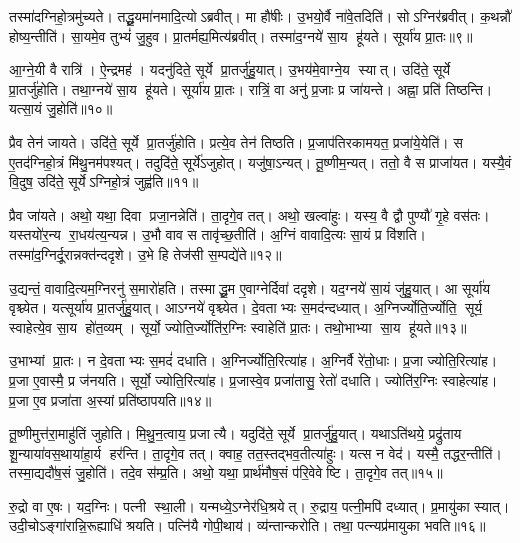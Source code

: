 तस्मा॑दग्निहो॒त्रमु॑च्यते।
तद्धू॒यमा॑नमादि॒त्योऽब्रवीत्।
मा हौ॑षीः।
उ॒भयो॒र्वै ना॑वे॒तदिति॑।
सोऽग्निर॑ब्रवीत्।
क॒थन्नौ॑ होष्य॒न्तीति॑।
सा॒यमे॒व तुभ्यं॑ जु॒हुव\sn{}।
प्रा॒तर्मह्य॒मित्य॑ब्रवीत्।
तस्मा॑द॒ग्नये॑ सा॒य हू॑यते।
सूर्या॑य प्रा॒तः॥९॥

आ॒ग्ने॒यी वै रात्रि॑।
ऐ॒न्द्रमह॑।
यदनु॑दिते॒ सूर्ये प्रा॒तर्जु॑हु॒यात्।
उ॒भय॑मे॒वाग्ने॒य स्यात्।
उदि॑ते॒ सूर्ये प्रा॒तर्जु॑होति।
तथा॒ग्नये॑ सा॒य हू॑यते।
सूर्या॑य प्रा॒तः।
रात्रिं॒ वा अनु॑ प्र॒जाः प्र जा॑यन्ते।
अह्ना॒ प्रति॑ तिष्ठन्ति।
यत्सा॒यं जु॒होति॑॥१०॥

प्रैव तेन॑ जायते।
उदि॑ते॒ सूर्ये प्रा॒तर्जु॑होति।
प्रत्ये॒व तेन॑ तिष्ठति।
प्र॒जाप॑तिरकामयत॒ प्रजा॑ये॒येति॑।
स ए॒तद॑ग्निहो॒त्रं मि॑थु॒नम॑पश्यत्।
तदुदि॑ते॒ सूर्ये॑ऽजुहोत्।
यजु॑षा॒ऽन्यत्।
तू॒ष्णीम॒न्यत्।
ततो॒ वै स प्राजा॑यत।
यस्यै॒वं वि॒दुष॒ उदि॑ते॒ सूर्येऽग्निहो॒त्रं जुह्व॑ति॥११॥

प्रैव जा॑यते।
अथो॒ यथा॒ दिवा प्रजा॒नन्नेति॑।
ता॒दृगे॒व तत्।
अथो॒ खल्वा॑हुः।
यस्य॒ वै द्वौ पुण्यौ॑ गृ॒हे वस॑तः।
यस्तयो॑र॒न्य रा॒धय॑त्य॒न्यन्न।
उ॒भौ वाव स तावृ॑च्छ॒तीति॑।
अ॒ग्निं वावादि॒त्यः सा॒यं प्र वि॑शति।
तस्मा॑द॒ग्निर्दू॒रान्नक्त॑न्ददृशे।
उ॒भे हि तेज॑सी स॒म्पद्ये॑ते॥१२॥

उ॒द्यन्तं॒ वावादि॒त्यम॒ग्निरनु॑ स॒मारो॑हति।
तस्माद्धू॒म ए॒वाग्नेर्दिवा॑ ददृशे।
यद॒ग्नये॑ सा॒यं जु॑हु॒यात्।
आ सूर्या॑य वृश्च्येत।
यत्सूर्या॑य प्रा॒तर्जु॑हु॒यात्।
आऽग्नये॑ वृश्च्येत।
दे॒वताभ्यः स॒मद॑न्दध्यात्।
अ॒ग्निर्ज्योति॒र्ज्योति॒ सूर्य॒ स्वाहेत्ये॒व सा॒य हो॑त॒व्यम्।
सूर्यो॒ ज्योति॒र्ज्योति॑र॒ग्निः स्वाहेति॑ प्रा॒तः।
तथो॒भाभ्या सा॒य हू॑यते॥१३॥

उ॒भाभ्यां प्रा॒तः।
न दे॒वताभ्यः स॒मदं॑ दधाति।
अ॒ग्निर्ज्योति॒\-रित्या॑ह।
अ॒ग्निर्वै रे॑तो॒धाः।
प्र॒जा ज्योति॒रित्या॑ह।
प्र॒जा ए॒वास्मै॒ प्र ज॑नयति।
सूर्यो॒ ज्योति॒रित्या॑ह।
प्र॒जास्वे॒व प्रजा॑तासु॒ रेतो॑ दधाति।
ज्योति॑र॒ग्निः स्वाहेत्या॑ह।
प्र॒जा ए॒व प्रजा॑ता अ॒स्यां प्रति॑ष्ठापयति॥१४॥

तू॒ष्णीमुत्त॑रा॒माहु॑तिं जुहोति।
मि॒थु॒न॒त्वाय॒ प्रजात्यै।
यदुदि॑ते॒ सूर्ये प्रा॒तर्जु॑हु॒यात्।
यथाऽति॑थये॒ प्रद्रु॑ताय शू॒न्याया॑वस॒थाया॑हा॒र्य हर॑न्ति।
ता॒दृगे॒व तत्।
क्वाह॒ तत॒स्तद्भव॒तीत्या॑हुः।
यत्स न वेद॑।
यस्मै॒ तद्धर॒न्तीति॑।
तस्मा॒द्यदौ॑ष॒सं जु॒होति॑।
तदे॒व स॑म्प्र॒ति।
अथो॒ यथा॒ प्रार्थ॑मौष॒सं प॑रि॒वेवेष्टि।
ता॒दृगे॒व तत्॥१५॥\anuvakamend[अ॒मृ॒ष्ट॒ वि॒चि॒कित्स॑ति॒ जुह्व॑त्य॒जाम॑सृजताग्निहो॒त्र सूर्या॑य प्रा॒तर्जु॒होति॒ जुह्व॑ति स॒म्पद्ये॑ते हूयते स्थापयति सम्प्र॒ति द्वे च॑]

रु॒द्रो वा ए॒षः।
यद॒ग्निः।
पत्नी स्था॒ली।
यन्मध्ये॒ऽग्नेर॑धि॒श्रयेत्।
रु॒द्राय॒ पत्नी॒मपि॑ दध्यात्।
प्र॒मायु॑का स्यात्।
उदी॒चोऽ\-ङ्गा॑रान्नि॒रूह्याधि॑ श्रयति।
पत्नि॑यै गोपी॒थाय॑।
व्य॑न्तान्करोति।
तथा॒ पत्न्यप्र॑मायुका भवति॥१६॥

